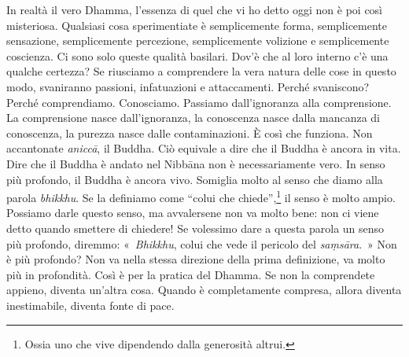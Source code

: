In realtà il vero Dhamma, l'essenza di quel che vi ho detto oggi non è
poi così misteriosa. Qualsiasi cosa sperimentiate è semplicemente forma,
semplicemente sensazione, semplicemente percezione, semplicemente
volizione e semplicemente coscienza. Ci sono solo queste qualità
basilari. Dov'è che al loro interno c'è una qualche certezza? Se
riusciamo a comprendere la vera natura delle cose in questo modo,
svaniranno passioni, infatuazioni e attaccamenti. Perché svaniscono?
Perché comprendiamo. Conosciamo. Passiamo dall'ignoranza alla
comprensione. La comprensione nasce dall'ignoranza, la conoscenza nasce
dalla mancanza di conoscenza, la purezza nasce dalle contaminazioni. È
così che funziona. Non accantonate \emph{aniccā}, il Buddha. Ciò
equivale a dire che il Buddha è ancora in vita. Dire che il Buddha è
andato nel Nibbāna non è necessariamente vero. In senso più
profondo, il Buddha è ancora vivo. Somiglia molto al senso che diamo
alla parola \emph{bhikkhu}. Se la definiamo come ``colui che
chiede'',\footnote{Ossia uno che vive dipendendo dalla generosità
  altrui.} il senso è molto ampio. Possiamo darle questo senso, ma
avvalersene non va molto bene: non ci viene detto quando smettere di
chiedere! Se volessimo dare a questa parola un senso più profondo,
diremmo: «~\emph{Bhikkhu}, colui che vede il pericolo del
\emph{saṃsāra}.~» Non è più profondo? Non va nella stessa direzione
della prima definizione, va molto più in profondità. Così è per la
pratica del Dhamma. Se non la comprendete appieno, diventa un'altra
cosa. Quando è completamente compresa, allora diventa inestimabile,
diventa fonte di pace.

